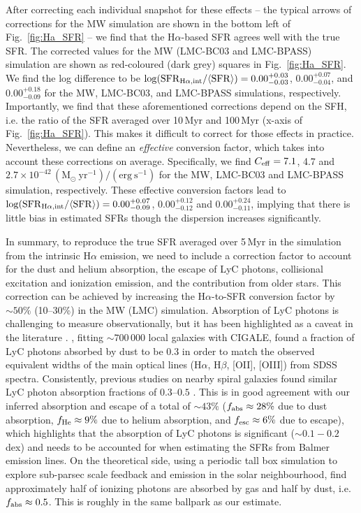 \documentclass[fleqn,usenatbib]{mnras}
\begin{document}
After correcting each individual snapshot for these effects -- the typical arrows of corrections for the MW simulation are shown in the bottom left of Fig.~\ref{fig:Ha_SFR} -- we find that the H$\alpha$-based SFR agrees well with the true SFR. The corrected values for the MW (LMC-BC03 and LMC-BPASS) simulation are shown as red-coloured (dark grey) squares in Fig.~\ref{fig:Ha_SFR}. We find the log difference to be $\log(\mathrm{SFR}_{\rm H\alpha, int}/\langle\mathrm{SFR}\rangle)=0.00_{-0.03}^{+0.03}$, $0.00_{-0.04}^{+0.07}$, and $0.00_{-0.09}^{+0.18}$ for the MW, LMC-BC03, and LMC-BPASS simulations, respectively. Importantly, we find that these aforementioned corrections depend on the SFH, i.e. the ratio of the SFR averaged over 10\,Myr and 100\,Myr (x-axis of Fig.~\ref{fig:Ha_SFR}). This makes it difficult to correct for those effects in practice. Nevertheless, we can define an \textit{effective} conversion factor, which takes into account these corrections on average. Specifically, we find $C_{\rm eff}=7.1$, 4.7 and $2.7\times10^{-42}\,(\text{M}_{\odot}~\mathrm{yr}^{-1})/(\mathrm{erg}~\mathrm{s}^{-1})$ for the MW, LMC-BC03 and LMC-BPASS simulation, respectively. These effective conversion factors lead to $\log(\mathrm{SFR}_{\rm H\alpha, int}/\langle\mathrm{SFR}\rangle)=0.00_{-0.09}^{+0.07}$, $0.00_{-0.12}^{+0.12}$ and $0.00_{-0.11}^{+0.24}$, implying that there is little bias in estimated SFRs though the dispersion increases significantly.

In summary, to reproduce the true SFR averaged over 5\,Myr in the simulation from the intrinsic H$\alpha$ emission, we need to include a correction factor to account for the dust and helium absorption, the escape of LyC photons, collisional excitation and ionization emission, and the contribution from older stars. This correction can be achieved by increasing the H$\alpha$-to-SFR conversion factor by $\sim50\%$ (10--30\%) in the MW (LMC) simulation. Absorption of LyC photons is challenging to measure observationally, but it has been highlighted as a caveat in the literature \citep[e.g.,][]{puglisi16, tacchella18_dust}. \citet{salim16}, fitting $\sim700\,000$ local galaxies with CIGALE, found a fraction of LyC photons absorbed by dust to be 0.3 in order to match the observed equivalent widths of the main optical lines (H$\alpha$, H$\beta$, [OII], [OIII]) from SDSS spectra. Consistently, previous studies on nearby spiral galaxies found similar LyC photon absorption fractions of $0.3$--$0.5$ \citep{inoue01, hirashita03, iglesias-paramo04}. This is in good agreement with our inferred absorption and escape of a total of $\sim43\%$ ($f_{\rm abs}\approx28\%$ due to dust absorption, $f_{\rm He}\approx9\%$ due to helium absorption, and $f_{\rm esc}\approx6\%$ due to escape), which highlights that the absorption of LyC photons is significant ($\sim0.1-0.2$ dex) and needs to be accounted for when estimating the SFRs from Balmer emission lines. On the theoretical side, using a periodic tall box simulation to explore sub-parsec scale feedback and emission in the solar neighbourhood, \citet{kado-fong20} find approximately half of ionizing photons are absorbed by gas and half by dust, i.e. $f_{\rm abs}\approx0.5$. This is roughly in the same ballpark as our estimate. 
\end{document}
